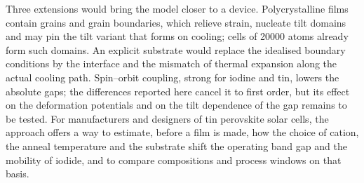 {Three extensions would bring the model closer to a device. Polycrystalline films contain grains and grain
boundaries, which relieve strain, nucleate tilt domains and may pin the tilt variant that forms on cooling; cells of
\num{20000} atoms already form such domains. An explicit substrate would replace the idealised boundary conditions by
the interface and the mismatch of thermal expansion along the actual cooling path. Spin--orbit coupling, strong for
iodine and tin, lowers the absolute gaps; the differences reported here cancel it to first order, but its effect on the
deformation potentials and on the tilt dependence of the gap remains to be tested. For manufacturers and designers of
tin perovskite solar cells, the approach offers a way to estimate, before a film is made, how the choice of cation, the
anneal temperature and the substrate shift the operating band gap and the mobility of iodide, and to compare
compositions and process windows on that basis.
}
